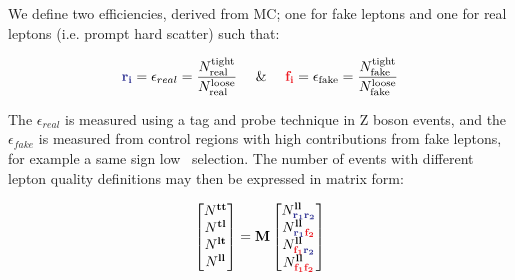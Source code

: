 We define two efficiencies, derived from MC; one for fake leptons and one for real leptons (i.e. prompt hard scatter) such that:

\begin{equation}
	\textcolor{Blue}{\mathbf{r_i}} = \epsilon_{real} = \frac{  N^{\text{tight}}_{\text{real}} }{ N^{\text{loose}}_{\text{real}} }~~~~\&~~~~\textcolor{Red}{\mathbf{f_i}} = \epsilon_{\text{fake}} = \frac{ N^{\text{tight}}_{\text{fake}} }{ N^{\text{loose}}_{\text{fake}}}
	\label{eq:fake_eff}	
\end{equation}

The $\epsilon_{real}$ is measured using a tag and probe technique in Z boson events, and the $\epsilon_{fake}$ is measured from control regions with high contributions from fake leptons, for example a same sign low \etmiss\ selection. The number of events with different lepton quality definitions may then be expressed in matrix form:

\begin{equation}
\begin{bmatrix}
N^{\mathbf{tt}} \\
N^{\mathbf{t}\mathbf{l}} \\
N^{\mathbf{l}\mathbf{t}} \\
N^{\mathbf{ll}} \\
\end{bmatrix} 
= \mathbf{M}
\begin{bmatrix}


N^{\mathbf{ll}}_{\rone\rtwo}\\
N^{\mathbf{ll}}_{\rone\ftwo}\\
N^{\mathbf{ll}}_{\fone\rtwo}\\
N^{\mathbf{ll}}_{\fone\ftwo}\\
\end{bmatrix}
\label{eq:fake}
\end{equation}

